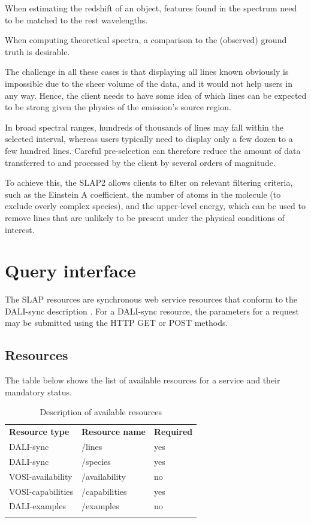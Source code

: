 \documentclass[11pt,a4paper]{ivoa}
\begin{document}
    When estimating the redshift of an object, features found in the spectrum need to be matched to the rest wavelengths.

    When computing theoretical spectra, a comparison to the (observed) ground truth is desirable.

The challenge in all these cases is that displaying all lines known obviously is impossible
due to the sheer volume of the data, and it would not help users in any way.
Hence, the client needs to have some idea of which lines can be expected to be strong given
the physics of the emission's source region.

In broad spectral ranges, hundreds of thousands of lines may fall within the selected interval,
whereas users typically need to display only a few dozen to a few hundred lines.
Careful pre-selection can therefore reduce the amount of data transferred to and
processed by the client by several orders of magnitude.

To achieve this, the SLAP2 allows clients to filter on relevant filtering criteria,
such as the Einstein A coefficient, the number of atoms in the molecule
(to exclude overly complex species), and the upper-level energy,
which can be used to remove lines that are unlikely to be present under the physical conditions
of interest.


\clearpage\section{Query interface}
\label{sect:query-interface}

The SLAP resources are synchronous web service resources that conform to
the DALI-sync description \citep{2017ivoa.spec.0517D}. For a DALI-sync
resource, the parameters for a request may be submitted using the HTTP
GET or POST methods.

\subsection{Resources}
\label{sect:dali-resources}

The table below shows the list of available resources for a
service and their mandatory status.

\begin{table}[htbp]
\centering
\caption{Description of available resources}
\begin{tabular}{p{4.806cm}p{4.894cm}p{4.951cm}}
\sptablerule
\textbf{Resource type}&
\textbf{Resource name}&
\textbf{Required}\\
\sptablerule
 DALI-sync &
 /lines &
 yes\\
 DALI-sync &
 /species &
 yes\\
 VOSI-availability &
 /availability &
 no\\
 VOSI-capabilities &
 /capabilities &
 yes\\
  DALI-examples &
 /examples &
 no\\
\sptablerule
\end{tabular}
\end{table}
\end{document}
